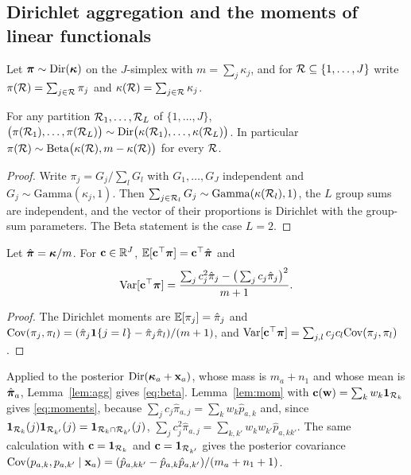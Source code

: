 \begin{appendix}

\section{Dirichlet aggregation and the moments of linear functionals}\label{app:dirichlet}

Let $\bm{\pi}\sim\mathrm{Dir}(\bm{\kappa})$ on the $J$-simplex with $m=\sum_j\kappa_j$, and for $\mathcal{R}\subseteq\{1,\dots,J\}$ write $\pi(\mathcal{R})=\sum_{j\in\mathcal{R}}\pi_j$ and $\kappa(\mathcal{R})=\sum_{j\in\mathcal{R}}\kappa_j$.

\begin{lemma}[Aggregation]\label{lem:agg}
For any partition $\mathcal{R}_1,\dots,\mathcal{R}_L$ of $\{1,\dots,J\}$, $\big(\pi(\mathcal{R}_1),\dots,\pi(\mathcal{R}_L)\big)\sim\mathrm{Dir}\big(\kappa(\mathcal{R}_1),\dots,\kappa(\mathcal{R}_L)\big)$. In particular $\pi(\mathcal{R})\sim\mathrm{Beta}\big(\kappa(\mathcal{R}),m-\kappa(\mathcal{R})\big)$ for every $\mathcal{R}$.
\end{lemma}

\begin{proof}
Write $\pi_j=G_j/\sum_{l}G_l$ with $G_1,\dots,G_J$ independent and $G_j\sim\mathrm{Gamma}(\kappa_j,1)$. Then $\sum_{j\in\mathcal{R}_l}G_j\sim\mathrm{Gamma}(\kappa(\mathcal{R}_l),1)$, the $L$ group sums are independent, and the vector of their proportions is Dirichlet with the group-sum parameters. The Beta statement is the case $L=2$.
\end{proof}

\begin{lemma}\label{lem:mom}
Let $\hat{\bm{\pi}}=\bm{\kappa}/m$. For $\mathbf{c}\in\mathbb R^J$, $\mathbb{E}[\mathbf{c}^\top\bm{\pi}]=\mathbf{c}^\top\hat{\bm{\pi}}$ and
\begin{equation*}
\mathrm{Var}[\mathbf{c}^\top\bm{\pi}]=\frac{\sum_j c_j^2\hat\pi_j-\big(\sum_j c_j\hat\pi_j\big)^2}{m+1} .
\end{equation*}
\end{lemma}

\begin{proof}
The Dirichlet moments are $\mathbb{E}[\pi_j]=\hat\pi_j$ and $\mathrm{Cov}(\pi_j,\pi_l)=(\hat\pi_j\mathbf{1}\{j=l\}-\hat\pi_j\hat\pi_l)/(m+1)$, and $\mathrm{Var}[\mathbf{c}^\top\bm{\pi}]=\sum_{j,l}c_jc_l\mathrm{Cov}(\pi_j,\pi_l)$.
\end{proof}

Applied to the posterior $\mathrm{Dir}(\bm{\kappa}_a+\mathbf{x}_a)$, whose mass is $m_a+n_1$ and whose mean is $\hat{\bm{\pi}}_a$, Lemma~\ref{lem:agg} gives \eqref{eq:beta}. Lemma~\ref{lem:mom} with $\mathbf{c}(\mathbf{w})=\sum_k w_k\mathbf{1}_{\mathcal{R}_k}$ gives \eqref{eq:moments}, because $\sum_j c_j\hat\pi_{a,j}=\sum_k w_k\hat p_{a,k}$ and, since $\mathbf{1}_{\mathcal{R}_k}(j)\mathbf{1}_{\mathcal{R}_{k'}}(j)=\mathbf{1}_{\mathcal{R}_k\cap\mathcal{R}_{k'}}(j)$, $\sum_j c_j^2\hat\pi_{a,j}=\sum_{k,k'}w_kw_{k'}\hat p_{a,kk'}$. The same calculation with $\mathbf{c}=\mathbf{1}_{\mathcal{R}_k}$ and $\mathbf{c}=\mathbf{1}_{\mathcal{R}_{k'}}$ gives the posterior covariance $\mathrm{Cov}(p_{a,k},p_{a,k'}\mid\mathbf{x}_a)=(\hat p_{a,kk'}-\hat p_{a,k}\hat p_{a,k'})/(m_a+n_1+1)$.


\end{appendix}
